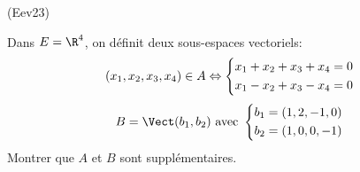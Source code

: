 \begin{tiny}(Eev23)\end{tiny} \label{inthyp1} Dans $E=\R^4$, on définit deux sous-espaces vectoriels:
\begin{displaymath}
 (x_1,x_2,x_3,x_4)\in A \\
\Leftrightarrow
\left\lbrace 
\begin{aligned}
 x_1 + x_2 + x_3 + x_ 4 & = 0 \\ 
x_1 - x_2 + x_3 -x_4 &= 0
\end{aligned}
\right. 
\end{displaymath}
\begin{displaymath}
 B = \Vect(b_1,b_2)\text{ avec }
\left\lbrace 
\begin{aligned}
 b_1 & = (1,2,-1,0) \\ 
 b_2 & = (1,0,0,-1)
\end{aligned}
\right. 
\end{displaymath}
Montrer que $A$ et $B$ sont supplémentaires.
